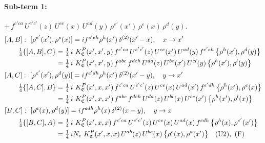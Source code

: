 \documentclass[10pt]{article}
\numberwithin{equation}{section}
\begin{document}
\paragraph{Sub-term 1:} $+\,f^{c'ca}\,U^{e'c'}(z)\,U^{ce}(x)\,U^{ad}(y)\,\rho^{e'}(x')\,\rho^{e}(x)\,\rho^{d}(y)$.
\begin{align}
&[A,B]:\ [\rho^{e'}(x'),\rho^{e}(x)]=i f^{e'eh}\rho^{h}(x')\,\delta^{(2)}(x'-x),\quad x\to x'\notag\\
&\qquad \tfrac14\{[A,B],C\}=\tfrac14\,i\,\,K^{P}_{\mathfrak C}(x',x',y)\,f^{c'ca}\,U^{e'c'}(z)\,U^{ce}(x')\,U^{ad}(y)\,f^{e'eh}\,\big\{\rho^{h}(x'),\rho^{d}(y)\big\}\notag\\
&\qquad\phantom{\tfrac14\{[A,B],C\}}=\tfrac14\,i\,\,K^{P}_{\mathfrak C}(x',x',y)\,f^{abc}\,f^{deh}\,U^{da}(z)\,U^{be}(x')\,U^{cl}(y)\,\big\{\rho^{h}(x'),\rho^{l}(y)\big\}
\label{eq:GIII.V.P-1-AB}\\
&[A,C]:\ [\rho^{e'}(x'),\rho^{d}(y)]=i f^{e'dh}\rho^{h}(x')\,\delta^{(2)}(x'-y),\quad y\to x'\notag\\
&\qquad \tfrac14\{[A,C],B\}=\tfrac14\,i\,\,K^{P}_{\mathfrak C}(x',x,x')\,f^{c'ca}\,U^{e'c'}(z)\,U^{ce}(x)\,U^{ad}(x')\,f^{e'dh}\,\big\{\rho^{h}(x'),\rho^{e}(x)\big\}\notag\\
&\qquad\phantom{\tfrac14\{[A,C],B\}}=\tfrac14\,i\,\,K^{P}_{\mathfrak C}(x',x,x')\,f^{abc}\,f^{deh}\,U^{da}(z)\,U^{bl}(x)\,U^{ce}(x')\,\big\{\rho^{h}(x'),\rho^{l}(x)\big\}
\label{eq:GIII.V.P-1-AC}\\
&[B,C]:\ [\rho^{e}(x),\rho^{d}(y)]=i f^{edh}\rho^{h}(x)\,\delta^{(2)}(x-y),\quad y\to x\notag\\
&\qquad \tfrac14\{[B,C],A\}=\tfrac14\,i\,\,K^{P}_{\mathfrak C}(x',x,x)\,f^{c'ca}\,U^{e'c'}(z)\,U^{ce}(x)\,U^{ad}(x)\,f^{edh}\,\big\{\rho^{h}(x),\rho^{e'}(x')\big\}\notag\\
&\qquad\phantom{\tfrac14\{[B,C],A\}}=\tfrac14\,i N_{c}\,\,K^{P}_{\mathfrak C}(x',x,x)\,U^{ab}(z)\,U^{bc}(x)\,\big\{\rho^{c}(x),\rho^{a}(x')\big\}\quad\text{(U2)},\ \text{(F)}
\label{eq:GIII.V.P-1-BC}
\end{align}
\end{document}
